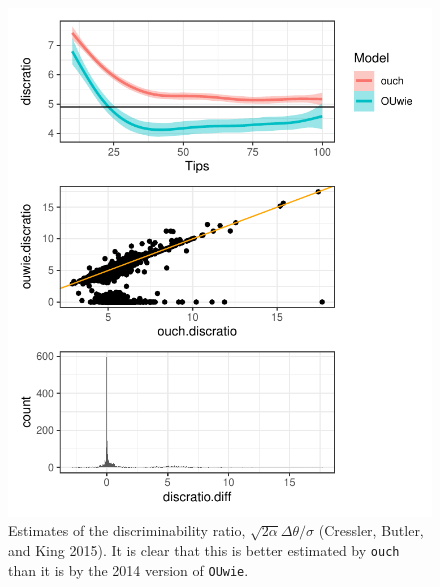 \documentclass[12pt,reqno,final]{amsart}\usepackage[]{graphicx}\usepackage[]{color}
\makeatletter
\def\maxwidth{ %
  \ifdim\Gin@nat@width>\linewidth
    \linewidth
  \else
    \Gin@nat@width
  \fi
}
\newenvironment{kframe}{%
 \def\at@end@of@kframe{}%
 \ifinner\ifhmode%
  \def\at@end@of@kframe{\end{minipage}}%
  \begin{minipage}{\columnwidth}%
 \fi\fi%
 \def\FrameCommand##1{\hskip\@totalleftmargin \hskip-\fboxsep
 \colorbox{shadecolor}{##1}\hskip-\fboxsep
     \hskip-\linewidth \hskip-\@totalleftmargin \hskip\columnwidth}%
 \MakeFramed {\advance\hsize-\width
   \@totalleftmargin\z@ \linewidth\hsize
   \@setminipage}}%
 {\par\unskip\endMakeFramed%
 \at@end@of@kframe}
\newenvironment{knitrout}{}{} %
\theoremstyle{plain}
\numberwithin{equation}{part}
\makeatother
\begin{document}
\begin{knitrout}
\color{fgcolor}\begin{kframe}


{\ttfamily\noindent\itshape{}}\end{kframe}\begin{figure}
\includegraphics[width=\maxwidth]{figure/unnamed-chunk-5-1} \caption{Estimates of the discriminability ratio, $\sqrt{2\alpha}\Delta\theta/\sigma$ (Cressler, Butler, and King 2015). It is clear that this is better estimated by \texttt{ouch} than it is by the 2014 version of \texttt{OUwie}.}\label{fig:unnamed-chunk-5}
\end{figure}


\end{knitrout}
\end{document}
